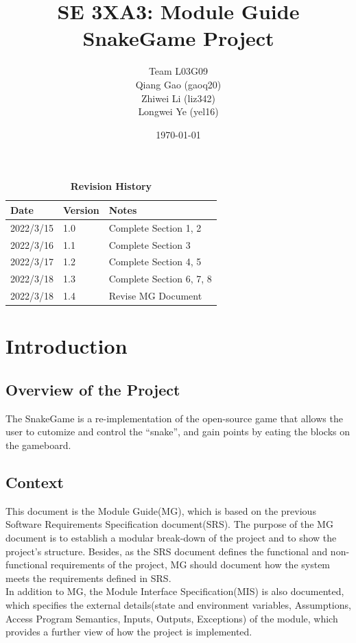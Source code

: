 \documentclass[12pt, titlepage]{article}
\title{SE 3XA3: Module Guide\\SnakeGame Project}
\author{ Team L03G09
		\\ Qiang Gao  (gaoq20)
		\\ Zhiwei Li  (liz342)
		\\ Longwei Ye (yel16)
}
\date{\today}
\begin{document}
\maketitle

\tableofcontents
\listoftables
\listoffigures

\begin{table}[bp]
\begin{tabularx}{\textwidth}{p{3cm}p{2cm}X}
\toprule {\bf Date} & {\bf Version} & {\bf Notes}\\
\midrule
2022/3/15 & 1.0 & Complete Section 1, 2\\
2022/3/16 & 1.1 & Complete Section 3\\
2022/3/17 & 1.2 & Complete Section 4, 5\\
2022/3/18 & 1.3 & Complete Section 6, 7, 8\\
2022/3/18 & 1.4 & Revise MG Document\\
\bottomrule
\end{tabularx}
\caption{\bf Revision History}
\end{table}

\newpage


\section{Introduction}
\subsection{Overview of the Project}
The SnakeGame is a re-implementation of the open-source game that allows the user to cutomize and control the ``snake'', and gain points by eating the blocks on the gameboard.

\subsection{Context}
This document is the Module Guide(MG), which is based on the previous Software Requirements Specification document(SRS). The purpose of the MG document is to establish a modular break-down of the project and to show the project's structure. Besides, as the SRS document defines the functional and non-functional requirements of the project, MG should document how the system meets the requirements defined in SRS.\\

\noindent In addition to MG, the Module Interface Specification(MIS) is also documented, which specifies the external details(state and environment variables, Assumptions, Access Program Semantics, Inputs, Outputs, Exceptions) of the module, which provides a further view of how the project is implemented.
\end{document}
